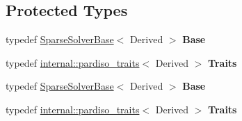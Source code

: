 \subsection*{Protected Types}
\begin{DoxyCompactItemize}
\item 
\mbox{\label{class_eigen_1_1_pardiso_impl_aebf63524acad1cd560a3b293faf4df7e}} 
typedef \hyperlink{group___sparse_core___module_class_eigen_1_1_sparse_solver_base}{Sparse\+Solver\+Base}$<$ Derived $>$ {\bfseries Base}
\item 
\mbox{\label{class_eigen_1_1_pardiso_impl_a8a43f20311beb4b0571cb9d0c6703277}} 
typedef \hyperlink{struct_eigen_1_1internal_1_1pardiso__traits}{internal\+::pardiso\+\_\+traits}$<$ Derived $>$ {\bfseries Traits}
\item 
\mbox{\label{class_eigen_1_1_pardiso_impl_aebf63524acad1cd560a3b293faf4df7e}} 
typedef \hyperlink{group___sparse_core___module_class_eigen_1_1_sparse_solver_base}{Sparse\+Solver\+Base}$<$ Derived $>$ {\bfseries Base}
\item 
\mbox{\label{class_eigen_1_1_pardiso_impl_a8a43f20311beb4b0571cb9d0c6703277}} 
typedef \hyperlink{struct_eigen_1_1internal_1_1pardiso__traits}{internal\+::pardiso\+\_\+traits}$<$ Derived $>$ {\bfseries Traits}
\end{DoxyCompactItemize}
